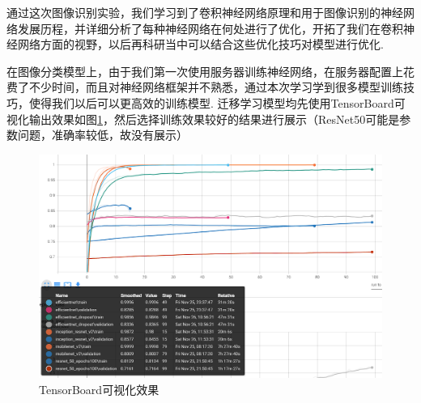 \documentclass[12pt, a4paper, oneside]{ctexart}
\numberwithin{equation}{section}  %
\begin{document}
通过这次图像识别实验，我们学习到了卷积神经网络原理和用于图像识别的神经网络发展历程，并详细分析了每种神经网络在何处进行了优化，开拓了我们在卷积神经网络方面的视野，以后再科研当中可以结合这些优化技巧对模型进行优化.

在图像分类模型上，由于我们第一次使用服务器训练神经网络，在服务器配置上花费了不少时间，而且对神经网络框架并不熟悉，通过本次学习学到很多模型训练技巧，使得我们以后可以更高效的训练模型. 迁移学习模型均先使用TensorBoard可视化输出效果如图\ref{fig-TensorBoard}，然后选择训练效果较好的结果进行展示（ResNet50可能是参数问题，准确率较低，故没有展示）\vspace*{-0.5cm}
\begin{figure}[htbp]
  \hspace*{-1.5cm}
  \centering
  \includegraphics[scale=0.6]{TensorBoard.png}
  \caption{TensorBoard可视化效果}
  \label{fig-TensorBoard}
\end{figure}

\clearpage
\appendix
\end{document}
